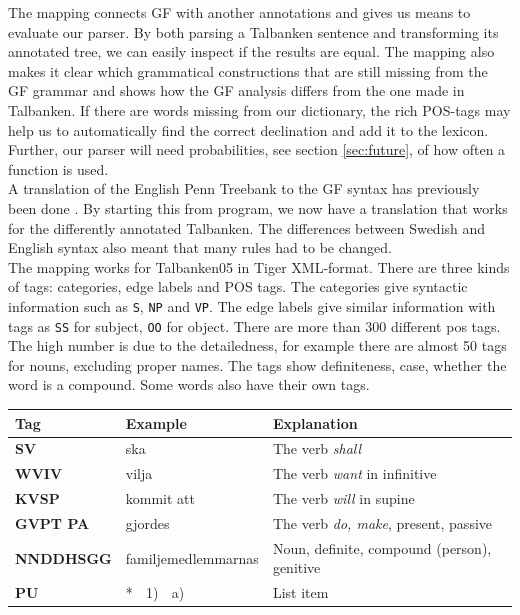 \documentclass{report}
\begin{document}
The mapping connects GF with another annotations and gives us means to evaluate
our parser. By both parsing a Talbanken sentence and transforming its annotated tree, we can
easily inspect if the results are equal.
The mapping also makes it clear which grammatical constructions that are still missing
from the GF grammar and shows how the GF analysis differs from the one made
in Talbanken.
If there are words missing from our dictionary, the rich
POS-tags may help us to automatically find the correct declination and add it to the
lexicon. Further, our parser will need probabilities, see section
\ref{sec:future}, of how often a function is used.\\

A translation of the English Penn Treebank to the GF syntax has previously been done \cite{gfpenn}.
By starting this from program, we now have
a translation that works for the differently annotated Talbanken. The differences between
Swedish and English syntax also meant that many rules had to be changed.\\

The mapping works for Talbanken05 in Tiger XML-format.
There are three kinds of tags: categories, edge labels and POS tags. 
The categories give syntactic information such as \verb|S|, \verb|NP| and \verb|VP|.
The edge labels give similar information with tags as \verb|SS| for subject, 
\verb|OO| for object. There are more than 300 different pos tags. The high
number is due to the detailedness, for example there are almost 50 tags for
nouns, excluding proper names. The tags show definiteness, case, whether the
word is a compound. Some words also have their own tags.\\

\begin{tabular}{lll}
\textbf{Tag} & \textbf{Example} & \textbf{Explanation} \\
\hline
\textbf{SV} & ska & The verb \emph{shall}\\
\textbf{WVIV} & vilja & The verb \emph{want} in infinitive\\
\textbf{KVSP} & kommit att & The verb \emph{will} in supine\\
\textbf{GVPT  PA} & gjordes & The verb \emph{do, make}, present, passive \\
\textbf{NNDDHSGG} & familjemedlemmarnas & Noun, definite, compound (person), genitive \\
\textbf{PU} & * $\;$ 1) $\;$ a) & List item\\
\end{tabular}\\
\end{document}
